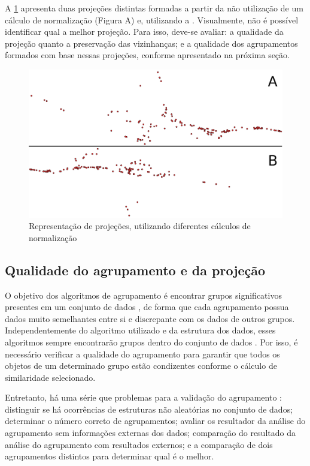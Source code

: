 			A \cref{fig:projecoes} apresenta duas projeções distintas formadas a partir da
			não utilização de um cálculo de normalização (Figura A) e, utilizando a
			. Visualmente, não é possível identificar qual
			a melhor projeção. Para isso, deve-se avaliar: a qualidade da projeção quanto
			a preservação das vizinhanças; e a qualidade dos agrupamentos formados com base
			nessas projeções, conforme apresentado na próxima seção.
						
			\begin{figure}[h]
				\centering
				\includegraphics[width=0.7\linewidth]{imagem/projecoes}
				\caption{Representação de projeções, utilizando diferentes cálculos de normalização}
				\label{fig:projecoes}
			\end{figure}
			
		
		\subsection{Qualidade do agrupamento e da projeção}
		\label{subsec:qualidade}
			O objetivo dos algoritmos de agrupamento é encontrar grupos significativos
			presentes em um conjunto de dados \cite{Halkidi2001}, de forma que cada agrupamento
			possua dados muito semelhantes entre si e discrepante com os dados de outros grupos.
			Independentemente do algoritmo utilizado e da estrutura dos dados,
			esses algoritmos sempre encontrarão grupos dentro do conjunto de dados
			\cite{Tan:2005:ch8}. Por isso, é necessário verificar a qualidade do
			agrupamento para garantir que todos os objetos de um determinado grupo
			estão condizentes conforme o cálculo de similaridade selecionado.
			
			Entretanto, há uma série que problemas para a validação do agrupamento
			\cite{Tan:2005:ch8}: distinguir se há ocorrências de estruturas não aleatórias
			no conjunto de dados; determinar o número correto de agrupamentos; avaliar
			os resultador da análise do agrupamento sem informações externas dos dados;
			comparação do resultado da análise do agrupamento com resultados externos;
			e a comparação de dois agrupamentos distintos para determinar qual é o melhor.
			
